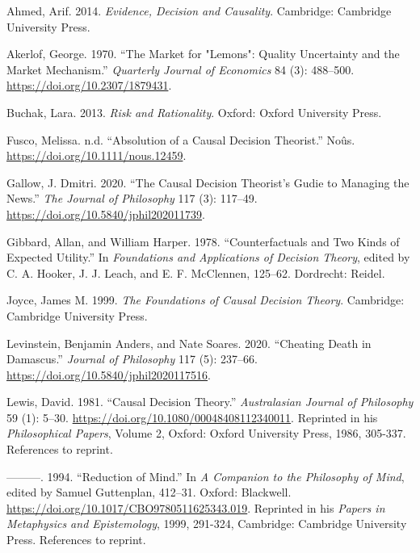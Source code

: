 \documentclass[
  11pt,
  letterpaper,
  DIV=11,
  numbers=noendperiod,
  oneside]{scrartcl}
\newlength{\cslhangindent}
\newenvironment{CSLReferences}[2] %
 {\begin{list}{}{%
  \setlength{\itemindent}{0pt}
  \setlength{\leftmargin}{0pt}
  \setlength{\parsep}{0pt}
  \ifodd #1
   \setlength{\leftmargin}{\cslhangindent}
   \setlength{\itemindent}{-1\cslhangindent}
  \fi
  \setlength{\itemsep}{#2\baselineskip}}}
 {\end{list}}
\begin{document}
\label{refs}
\begin{CSLReferences}{1}{0}
Ahmed, Arif. 2014. \emph{Evidence, Decision and Causality}. Cambridge:
{C}ambridge {U}niversity {P}ress.

Akerlof, George. 1970. {``The Market for "Lemons": Quality Uncertainty
and the Market Mechanism.''} \emph{Quarterly Journal of Economics} 84
(3): 488--500. \url{https://doi.org/10.2307/1879431}.

Buchak, Lara. 2013. \emph{Risk and Rationality}. Oxford: Oxford
University Press.

Fusco, Melissa. n.d. {``Absolution of a Causal Decision Theorist.''}
No{û}s. \url{https://doi.org/10.1111/nous.12459}.

Gallow, J. Dmitri. 2020. {``The Causal Decision Theorist's Gudie to
Managing the News.''} \emph{The Journal of Philosophy} 117 (3): 117--49.
\url{https://doi.org/10.5840/jphil202011739}.

Gibbard, Allan, and William Harper. 1978. {``Counterfactuals and Two
Kinds of Expected Utility.''} In \emph{Foundations and Applications of
Decision Theory}, edited by C. A. Hooker, J. J. Leach, and E. F.
McClennen, 125--62. Dordrecht: Reidel.

Joyce, James M. 1999. \emph{The Foundations of Causal Decision Theory}.
Cambridge: Cambridge University Press.

Levinstein, Benjamin Anders, and Nate Soares. 2020. {``Cheating Death in
Damascus.''} \emph{Journal of Philosophy} 117 (5): 237--66.
\url{https://doi.org/10.5840/jphil2020117516}.

Lewis, David. 1981. {``Causal Decision Theory.''} \emph{Australasian
Journal of Philosophy} 59 (1): 5--30.
\url{https://doi.org/10.1080/00048408112340011}. Reprinted in his
\emph{Philosophical Papers}, Volume 2, Oxford: Oxford University Press,
1986, 305-337. References to reprint.

---------. 1994. {``Reduction of Mind.''} In \emph{A Companion to the
Philosophy of Mind}, edited by Samuel Guttenplan, 412--31. Oxford:
Blackwell. \url{https://doi.org/10.1017/CBO9780511625343.019}. Reprinted
in his \emph{Papers in Metaphysics and Epistemology}, 1999, 291-324,
Cambridge: Cambridge University Press. References to reprint.


\end{CSLReferences}
\end{document}
